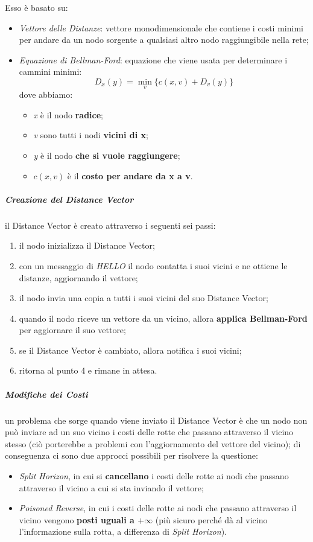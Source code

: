 \documentclass[a4paper]{article}
\begin{document}
				Esso è basato su:
				\begin{itemize}
					\item \emph{Vettore delle Distanze}: vettore monodimensionale che contiene i costi minimi per andare da un nodo sorgente a qualsiasi altro nodo raggiungibile nella rete;
					\item \emph{Equazione di Bellman-Ford}: equazione che viene usata per determinare i cammini minimi:
					\[ D_x(y) = \min_v\{c(x, v) + D_v(y)\} \]
					dove abbiamo:
					\begin{itemize}
						\item \emph{x} è il nodo \textbf{radice};
						\item \emph{v} sono tutti i nodi \textbf{vicini di x};
						\item \emph{y} è il nodo \textbf{che si vuole raggiungere};
						\item $ c(x, v) $ è il \textbf{costo per andare da x a v}.
					\end{itemize}
				\end{itemize}
				
				\subparagraph{Creazione del Distance Vector}
					il Distance Vector è creato attraverso i seguenti sei passi:
					\begin{enumerate}
						\item il nodo inizializza il Distance Vector;
						\item con un messaggio di \emph{HELLO} il nodo contatta i suoi vicini e ne ottiene le distanze, aggiornando il vettore;
						\item il nodo invia una copia a tutti i suoi vicini del suo Distance Vector;
						\item quando il nodo riceve un vettore da un vicino, allora \textbf{applica Bellman-Ford} per aggiornare il suo vettore;
						\item se il Distance Vector è cambiato, allora notifica i suoi vicini;
						\item ritorna al punto 4 e rimane in attesa.
					\end{enumerate}
					
				\subparagraph{Modifiche dei Costi}
					un problema che sorge quando viene inviato il Distance Vector è che un nodo non può inviare ad un suo vicino i costi delle rotte che passano attraverso il vicino stesso (ciò porterebbe a problemi con l'aggiornamento del vettore del vicino); di conseguenza ci sono due approcci possibili per risolvere la questione:
					\begin{itemize}
						\item \emph{Split Horizon}, in cui si \textbf{cancellano} i costi delle rotte ai nodi che passano attraverso il vicino a cui si sta inviando il vettore;
						\item \emph{Poisoned Reverse}, in cui i costi delle rotte ai nodi che passano attraverso il vicino vengono \textbf{posti uguali a $ +\infty $} (più sicuro perché dà al vicino l'informazione sulla rotta, a differenza di \emph{Split Horizon}).
					\end{itemize}
					
\end{document}
